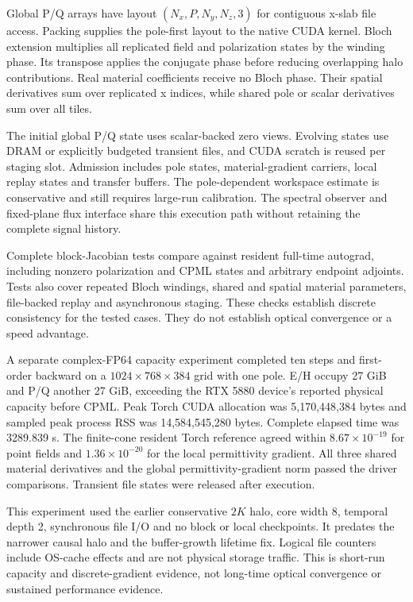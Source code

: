 \documentclass[11pt,a4paper]{article}
\begin{document}
Global P/Q arrays have layout $(N_x,P,N_y,N_z,3)$ for contiguous x-slab
file access. Packing supplies the pole-first layout to the native CUDA
kernel. Bloch extension multiplies all replicated field and polarization
states by the winding phase. Its transpose applies the conjugate phase
before reducing overlapping halo contributions. Real material coefficients
receive no Bloch phase. Their spatial derivatives sum over replicated x
indices, while shared pole or scalar derivatives sum over all tiles.

The initial global P/Q state uses scalar-backed zero views. Evolving
states use DRAM or explicitly budgeted transient files, and CUDA scratch
is reused per staging slot. Admission includes pole states, material-gradient
carriers, local replay states and transfer buffers. The pole-dependent
workspace estimate is conservative and still requires large-run calibration.
The spectral observer and fixed-plane flux interface share this execution
path without retaining the complete signal history.

Complete block-Jacobian tests compare against resident full-time autograd,
including nonzero polarization and CPML states and arbitrary endpoint
adjoints. Tests also cover repeated Bloch windings, shared and spatial
material parameters, file-backed replay and asynchronous staging. These
checks establish discrete consistency for the tested cases. They do not
establish optical convergence or a speed advantage.

A separate complex-FP64 capacity experiment completed ten steps and
first-order backward on a $1024\times768\times384$ grid with one pole.
E/H occupy 27 GiB and P/Q another 27 GiB, exceeding the RTX 5880 device's
reported physical capacity before CPML. Peak Torch CUDA allocation was
5,170,448,384 bytes and sampled peak process RSS was 14,584,545,280 bytes.
Complete elapsed time was 3289.839 s. The finite-cone resident Torch
reference agreed within $8.67\times10^{-19}$ for point fields and
$1.36\times10^{-20}$ for the local permittivity gradient. All three shared
material derivatives and the global permittivity-gradient norm passed the
driver comparisons. Transient file states were released after execution.

This experiment used the earlier conservative $2K$ halo, core width 8,
temporal depth 2, synchronous file I/O and no block or local checkpoints.
It predates the narrower causal halo and the buffer-growth lifetime fix.
Logical file counters include OS-cache effects and are not physical storage
traffic. This is short-run capacity and discrete-gradient evidence, not
long-time optical convergence or sustained performance evidence.
\end{document}
